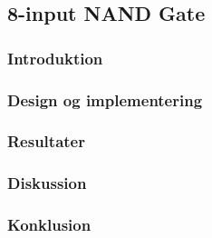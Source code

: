 \subsection{8-input NAND Gate}

\subsubsection{Introduktion}

\subsubsection{Design og implementering}
\subsubsection{Resultater}
\subsubsection{Diskussion}
\subsubsection{Konklusion}